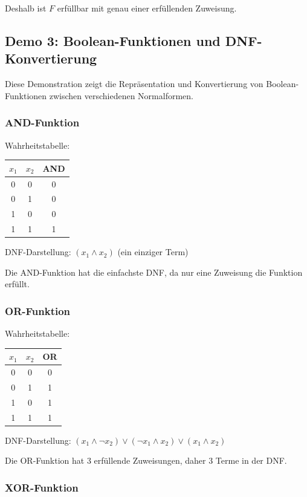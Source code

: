 ﻿\documentclass[a4paper,12pt]{article}
\theoremstyle{definition}
\begin{document}
Deshalb ist $F$ erfüllbar mit genau einer erfüllenden Zuweisung.

\subsection{Demo 3: Boolean-Funktionen und DNF-Konvertierung}

Diese Demonstration zeigt die Repräsentation und Konvertierung von Boolean-Funktionen zwischen verschiedenen Normalformen.

\subsubsection{AND-Funktion}

Wahrheitstabelle:
\begin{center}
\begin{tabular}{cc|c}
$x_1$ & $x_2$ & AND \\
\hline
0 & 0 & 0 \\
0 & 1 & 0 \\
1 & 0 & 0 \\
1 & 1 & 1
\end{tabular}
\end{center}

DNF-Darstellung: $(x_1 \land x_2)$ (ein einziger Term)

Die AND-Funktion hat die einfachste DNF, da nur eine Zuweisung die Funktion erfüllt.

\subsubsection{OR-Funktion}

Wahrheitstabelle:
\begin{center}
\begin{tabular}{cc|c}
$x_1$ & $x_2$ & OR \\
\hline
0 & 0 & 0 \\
0 & 1 & 1 \\
1 & 0 & 1 \\
1 & 1 & 1
\end{tabular}
\end{center}

DNF-Darstellung: $(x_1 \land \neg x_2) \lor (\neg x_1 \land x_2) \lor (x_1 \land x_2)$

Die OR-Funktion hat 3 erfüllende Zuweisungen, daher 3 Terme in der DNF.

\subsubsection{XOR-Funktion}
\end{document}
